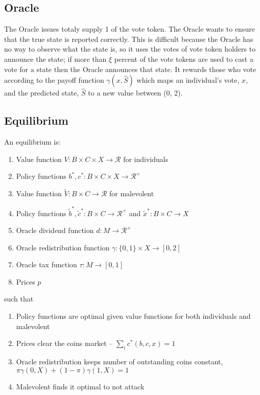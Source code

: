 \documentclass[12pt]{article}
\begin{document}
\subsection{Oracle}

  The Oracle issues totaly supply 1 of the vote token. The Oracle wants to ensure that the true
  state is reported correctly. This is difficult because the Oracle has no way to observe what the
  state is, so it uses the votes of vote token holders to announce the state; if more than $\xi$
  percent of the vote tokens are used to cast a vote for a state then the Oracle announces that
  state. It rewards those who vote according to the payoff function $\gamma(x, \hat{S})$ which maps an
  individual's vote, $x$, and the predicted state, $\hat{S}$ to a new value between (0, 2).


\subsection{Equilibrium}

  An equilibrium is:

  \begin{enumerate}
    \item Value function $V : B \times C \times X \rightarrow \mathcal{R}$ for individuals
    \item Policy functions $b^*, c^* : B \times C \times X \rightarrow \mathcal{R}^{+}$
    \item Value function $\tilde{V} : B \times C \rightarrow \mathcal{R}$ for malevolent
    \item Policy functions $\tilde{b}^*, \tilde{c}^* : B \times C \rightarrow \mathcal{R}^{+}$ and $\tilde{x}^* : B \times C \rightarrow X$
    \item Oracle dividend function $d : M \rightarrow \mathcal{R}^{+}$
    \item Oracle redistribution function $\gamma : \{0, 1\} \times X \rightarrow [0, 2]$
    \item Oracle tax function $\tau : M \rightarrow [0, 1]$
    \item Prices $p$
  \end{enumerate}

  such that

  \begin{enumerate}
    \item Policy functions are optimal given value functions for both individuals and malevolent
    \item Prices clear the coins market -- $\sum_i c^*(b, c, x) = 1$
    \item Oracle redistribution keeps number of outstanding coins constant, $\pi \gamma(0, X) + (1 - \pi) \gamma(1, X) = 1$
    \item Malevolent finds it optimal to not attack
  \end{enumerate}
\end{document}
